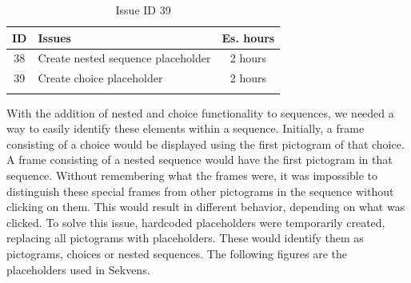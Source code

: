 \begin{longtable} { | c | p{12cm} | c | } 
\hline
	ID 	&	Issues	&		 Es. hours \\\hline
	38	&	Create nested sequence placeholder	&	2 hours \\\hline
	39 	&	Create choice placeholder	&	2 hours \\\hline
\caption{Issue ID 39}
\label{tab:spr3_choiceplaceholder}
\end{longtable}

With the addition of nested and choice functionality to sequences, we needed a way to easily identify these elements within a sequence. Initially, a frame consisting of a choice would be displayed using the first pictogram of that choice. A frame consisting of a nested sequence would have the first pictogram in that sequence. Without remembering what the frames were, it was impossible to distinguish these special frames from other pictograms in the sequence without clicking on them. This would result in different behavior, depending on what was clicked. To solve this issue, hardcoded placeholders were temporarily created, replacing all pictograms with placeholders. These would identify them as pictograms, choices or nested sequences. The following figures are the placeholders used in Sekvens.

